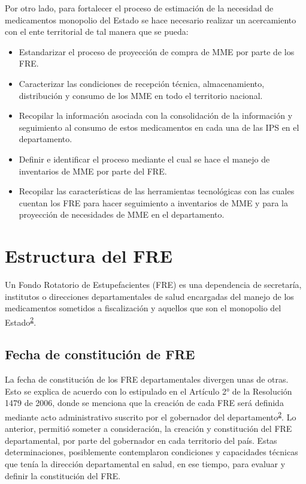 \documentclass[
]{book}
\begin{document}
Por otro lado, para fortalecer el proceso de estimación de la necesidad de medicamentos monopolio del Estado se hace necesario realizar un acercamiento con el ente territorial de tal manera que se pueda:

\begin{itemize}
\item
  Estandarizar el proceso de proyección de compra de MME por parte de los FRE.
\item
  Caracterizar las condiciones de recepción técnica, almacenamiento, distribución y consumo de los MME en todo el territorio nacional.
\item
  Recopilar la información asociada con la consolidación de la información y seguimiento al consumo de estos medicamentos en cada una de las IPS en el departamento.
\item
  Definir e identificar el proceso mediante el cual se hace el manejo de inventarios de MME por parte del FRE.
\item
  Recopilar las características de las herramientas tecnológicas con las cuales cuentan los FRE para hacer seguimiento a inventarios de MME y para la proyección de necesidades de MME en el departamento.
\end{itemize}

\hypertarget{estructura-del-fre}{%
\chapter{Estructura del FRE}\label{estructura-del-fre}}


Un Fondo Rotatorio de Estupefacientes (FRE) es una dependencia de secretaría, institutos o direcciones departamentales de salud encargadas del manejo de los medicamentos sometidos a fiscalización y aquellos que son el monopolio del Estado\textsuperscript{\protect\hyperlink{ref-MSPS1479-2006}{2}}.

\hypertarget{fecha-de-constituciuxf3n-de-fre}{%
\section{Fecha de constitución de FRE}\label{fecha-de-constituciuxf3n-de-fre}}

La fecha de constitución de los FRE departamentales divergen unas de otras. Esto se explica de acuerdo con lo estipulado en el Artículo 2° de la Resolución 1479 de 2006, donde se menciona que la creación de cada FRE será definida mediante acto administrativo suscrito por el gobernador del departamento\textsuperscript{\protect\hyperlink{ref-MSPS1479-2006}{2}}. Lo anterior, permitió someter a consideración, la creación y constitución del FRE departamental, por parte del gobernador en cada territorio del país. Estas determinaciones, posiblemente contemplaron condiciones y capacidades técnicas que tenía la dirección departamental en salud, en ese tiempo, para evaluar y definir la constitución del FRE.
\end{document}
